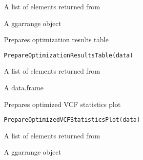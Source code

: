 \documentclass[letterpaper]{book}
\begin{document}
%
\begin{Arguments}
\begin{ldescription}
\item[\code{data}] A list of elements returned from 
\end{ldescription}
\end{Arguments}
%
\begin{Value}
A ggarrange object
\end{Value}
%
\begin{Description}\relax
Prepares optimization results table
\end{Description}
%
\begin{Usage}
\begin{verbatim}
PrepareOptimizationResultsTable(data)
\end{verbatim}
\end{Usage}
%
\begin{Arguments}
\begin{ldescription}
\item[\code{data}] A list of elements returned from 
\end{ldescription}
\end{Arguments}
%
\begin{Value}
A data.frame
\end{Value}
%
\begin{Description}\relax
Prepares optimized VCF statistics plot
\end{Description}
%
\begin{Usage}
\begin{verbatim}
PrepareOptimizedVCFStatisticsPlot(data)
\end{verbatim}
\end{Usage}
%
\begin{Arguments}
\begin{ldescription}
\item[\code{data}] A list of elements returned from 
\end{ldescription}
\end{Arguments}
%
\begin{Value}
A ggarrange object
\end{Value}
\end{document}
